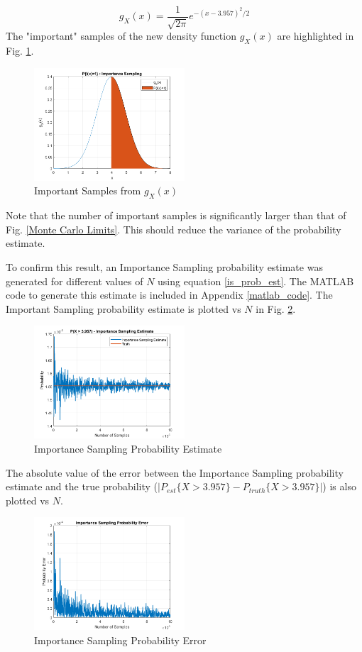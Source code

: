 \documentclass[conference]{IEEEtran}
\begin{document}
\begin{equation}
g_X(x) = \frac{1}{\sqrt{2\pi}}e^{-(x-3.957)^2/2}
\end{equation}
The "important" samples of the new density function $g_X(x)$ are highlighted in Fig. \ref{Important Samples}. 
\begin{figure}[H]
\centerline{\includegraphics[width=0.5\textwidth]{IS_Indicator.png}}
\caption{Important Samples from $g_X(x)$}
\label{Important Samples}
\end{figure}
\noindent
Note that the number of important samples is significantly larger than that of Fig. \ref{Monte Carlo Limits}. This should reduce the variance of the probability estimate. 
\par
To confirm this result, an Importance Sampling probability estimate was generated for different values of $N$ using equation \eqref{is_prob_est}. The MATLAB code to generate this estimate is included in Appendix \ref{matlab_code}. The Important Sampling probability estimate is plotted vs $N$ in Fig. \ref{Importance Sampling Estimate}.
\begin{figure}[H]
\centerline{\includegraphics[width=0.5\textwidth]{Importance_Sampling_Estimate.png}}
\caption{Importance Sampling Probability Estimate}
\label{Importance Sampling Estimate}
\end{figure}
\noindent
The absolute value of the error between the Importance Sampling probability estimate and the true probability ($|P_{est}\{X > 3.957\} - P_{truth}\{X > 3.957\}|$) is also plotted vs $N$.
\begin{figure}[H]
\centerline{\includegraphics[width=0.5\textwidth]{Importance_Sampling_Error.png}}
\caption{Importance Sampling Probability Error}
\label{Importance Sampling Perr}
\end{figure}
\end{document}

